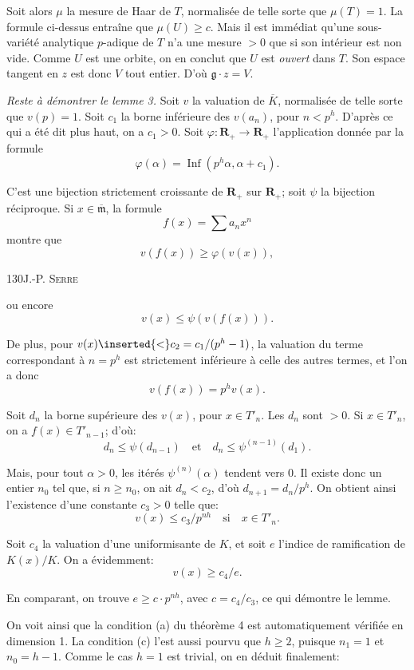 Soit alors $\mu$ la mesure de Haar de $T$, normalisée de telle sorte que $\mu(T)=1$. La formule ci-dessus entraîne que $\mu(U)\geq c$. Mais il est immédiat qu'une sous-variété analytique $p$-adique de $T$ n'a une mesure $>0$ que si son intérieur est non vide. Comme $U$ est une orbite, on en conclut que $U$ est \textit{ouvert} dans $T$. Son espace tangent en $z$ est donc $V$ tout entier. D'où $\mathfrak g\cdot z=V$.

\textit{Reste à démontrer le lemme 3.} Soit $v$ la valuation de $\overline K$, normalisée de telle sorte que $v(p)=1$. Soit $c_1$ la borne inférieure des $v(a_n)$, pour $n<p^h$. D'après ce qui a été dit plus haut, on a $c_1>0$. Soit $\varphi:\mathbf R_+\to\mathbf R_+$ l'application donnée par la formule
\[
\varphi(\alpha)=\operatorname{Inf}(p^h\alpha,\alpha+c_1).
\]

C'est une bijection strictement croissante de $\mathbf R_+$ sur $\mathbf R_+$; soit $\psi$ la bijection réciproque. Si $x\in\overline{\mathfrak m}$, la formule
\[
f(x)=\sum a_nx^n
\]
montre que
\[
v(f(x))\geq\varphi(v(x)),
\]

130\hfill J.-P. \textsc{Serre}

ou encore
\[
v(x)\leq\psi(v(f(x))).
\]

De plus, pour $v(x)\inserted{<}c_2=c_1/(p^h-1)$, la valuation du terme correspondant à $n=p^h$ est strictement inférieure à celle des autres termes, et l'on a donc
\[
v(f(x))=p^hv(x).
\]

Soit $d_n$ la borne supérieure des $v(x)$, pour $x\in T'_n$. Les $d_n$ sont $>0$. Si $x\in T'_n$, on a $f(x)\in T'_{n-1}$; d'où:
\[
d_n\leq\psi(d_{n-1})\quad\text{et}\quad d_n\leq\psi^{(n-1)}(d_1).
\]

Mais, pour tout $\alpha>0$, les itérés $\psi^{(n)}(\alpha)$ tendent vers 0. Il existe donc un entier $n_0$ tel que, si $n\geq n_0$, on ait $d_n<c_2$, d'où $d_{n+1}=d_n/p^h$. On obtient ainsi l'existence d'une constante $c_3>0$ telle que:
\[
v(x)\leq c_3/p^{nh}\quad\text{si}\quad x\in T'_n.
\]

Soit $c_4$ la valuation d'une uniformisante de $K$, et soit $e$ l'indice de ramification de $K(x)/K$. On a évidemment:
\[
v(x)\geq c_4/e.
\]

En comparant, on trouve $e\geq c\cdot p^{nh}$, avec $c=c_4/c_3$, ce qui démontre le lemme.

On voit ainsi que la condition (a) du théorème 4 est automatiquement vérifiée en dimension 1. La condition (c) l'est aussi pourvu que $h\geq2$, puisque $n_1=1$ et $n_0=h-1$. Comme le cas $h=1$ est trivial, on en déduit finalement:

